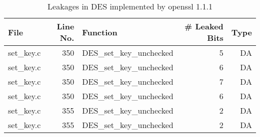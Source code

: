 \begin{table}[h!]
\centering\tiny\scriptsize
\caption{Leakages in DES implemented by openssl 1.1.1}\label{tab:DESopenssl1.1.1}
\begin{tabular}{lrlrr}
\hline
\textbf{File} & \textbf{Line No.} & \textbf{Function} & \textbf{\# Leaked Bits} & \textbf{Type} \\\hline
set\_key.c& 350&DES\_set\_key\_unchecked&5 &DA\\
set\_key.c& 350&DES\_set\_key\_unchecked&6 &DA\\
set\_key.c& 350&DES\_set\_key\_unchecked&7 &DA\\
set\_key.c& 350&DES\_set\_key\_unchecked&6 &DA\\
set\_key.c& 355&DES\_set\_key\_unchecked&2 &DA\\
set\_key.c& 355&DES\_set\_key\_unchecked&2 &DA\\
\hline
\end{tabular}
\renewcommand{\baselinestretch}{1.0}\selectfont
\end{table}
